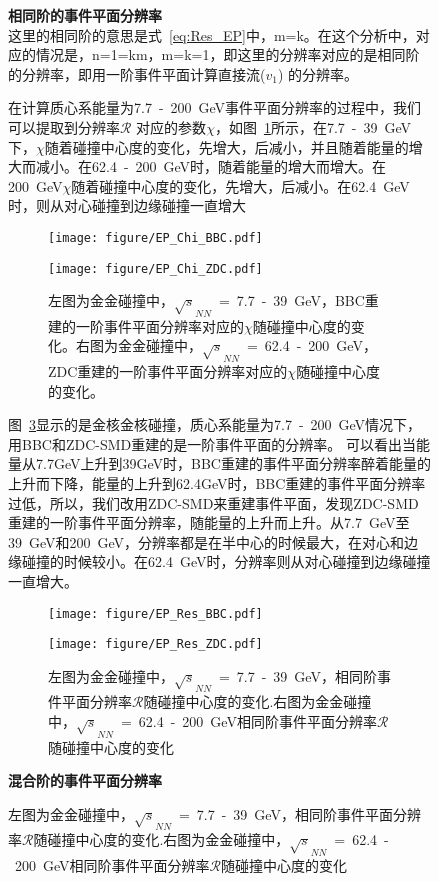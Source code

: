 \begin{figure}[htbp]

\textbf{ 相同阶的事件平面分辨率} \\

这里的相同阶的意思是式~\ref{eq:Res_EP}中，m=k。在这个分析中，对应的情况是，n=1=km，m=k=1，即这里的分辨率对应的是相同阶的分辨率，即用一阶事件平面计算直接流($v_{1}$) 的分辨率。

在计算质心系能量为7.7~-~200~GeV事件平面分辨率的过程中，我们可以提取到分辨率$\mathcal{R}$ 对应的参数$\chi$，如图~\ref{fig:EP_Chi_BBC_ZDC}所示，在7.7~-~39~GeV 下，$\chi$随着碰撞中心度的变化，先增大，后减小，并且随着能量的增大而减小。在62.4~-~200~GeV时，随着能量的增大而增大。在200~GeV$\chi$随着碰撞中心度的变化，先增大，后减小。在62.4~GeV时，则从对心碰撞到边缘碰撞一直增大

\begin{figure}[htbp]
\begin{minipage}[t]{0.5\textwidth}
\centering
\texttt{[image: figure/EP\_Chi\_BBC.pdf]}
\end{minipage}
\begin{minipage}[t]{0.5\textwidth}
\centering
\texttt{[image: figure/EP\_Chi\_ZDC.pdf]}
\end{minipage}
\caption{左图为金金碰撞中，$\sqrt{s}_{NN}$~=~7.7~-~39~GeV，BBC重建的一阶事件平面分辨率对应的$\chi$随碰撞中心度的变化。右图为金金碰撞中，$\sqrt{s}_{NN}$~=~62.4~-~200~GeV，ZDC重建的一阶事件平面分辨率对应的$\chi$随碰撞中心度的变化。}
\label{fig:EP_Chi_BBC_ZDC}
\end{figure}

图~\ref{fig:EP_Res_BBC_ZDC}显示的是金核金核碰撞，质心系能量为7.7~-~200~GeV情况下，用BBC和ZDC-SMD重建的是一阶事件平面的分辨率。
可以看出当能量从7.7GeV上升到39GeV时，BBC重建的事件平面分辨率醉着能量的上升而下降，能量的上升到62.4GeV时，BBC重建的事件平面分辨率过低，所以，我们改用ZDC-SMD来重建事件平面，发现ZDC-SMD 重建的一阶事件平面分辨率，随能量的上升而上升。从7.7~GeV至39~GeV和200~GeV，分辨率都是在半中心的时候最大，在对心和边缘碰撞的时候较小。在62.4~GeV时，分辨率则从对心碰撞到边缘碰撞一直增大。

\begin{figure}[htbp]
\begin{minipage}[t]{0.5\textwidth}
\centering
\texttt{[image: figure/EP\_Res\_BBC.pdf]}
\end{minipage}
\begin{minipage}[t]{0.5\textwidth}
\centering
\texttt{[image: figure/EP\_Res\_ZDC.pdf]}
\end{minipage}
\caption{左图为金金碰撞中，$\sqrt{s}_{NN}$~=~7.7~-~39~GeV，相同阶事件平面分辨率$\mathcal{R}$随碰撞中心度的变化.右图为金金碰撞中，$\sqrt{s}_{NN}$~=~62.4~-~200~GeV相同阶事件平面分辨率$\mathcal{R}$随碰撞中心度的变化}
\label{fig:EP_Res_BBC_ZDC}
\end{figure}
\textbf{ 混合阶的事件平面分辨率} \\


\end{figure}
